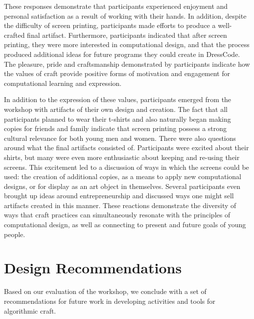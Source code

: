 \documentclass{sigchi}
\begin{document}
These responses demonstrate that participants experienced enjoyment and personal satisfaction as a result of working with their hands. In addition, despite the difficulty of screen printing, participants made efforts to produce a well-crafted final artifact. Furthermore, participants indicated that after screen printing, they were more interested in computational design, and that the process produced additional ideas for future programs they could create in DressCode. The pleasure, pride and craftsmanship demonstrated by participants indicate how the values of craft provide positive forms of motivation and engagement for computational learning and expression. 

In addition to the expression of these values, participants emerged from the workshop with artifacts of their own design and creation. The fact that all participants planned to wear their t-shirts and also naturally began making copies for friends and family indicate that screen printing possess a strong cultural relevance for both young men and women. %
There were also questions around what the final artifacts consisted of. Participants were excited about their shirts, but many were even more enthusiastic about keeping and re-using their screens. This excitement led to a discussion of ways in which the screens could be used: the creation of additional copies, as a means to apply new computational designs, or for display as an art object in themselves. Several participants even brought up ideas around entrepreneurship and discussed ways one might sell artifacts created in this manner. These reactions demonstrate the diversity of ways that craft practices can simultaneously resonate with the principles of computational design, as well as connecting to present and future goals of young people.

\section{Design Recommendations}
Based on our evaluation of the workshop, we conclude with a set of recommendations for future work in developing activities and tools for algorithmic craft. 
\end{document}
